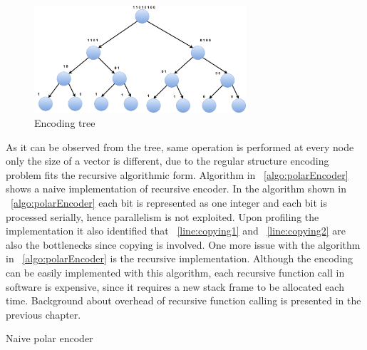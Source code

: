 \begin{figure}[]
	\centering
	\includegraphics[width=0.7\textwidth]{./figures/treeEncoding.pdf}
	\caption{Encoding tree}
	\label{fig:treeEncoding}
\end{figure}

As it can be observed from the tree, same operation is performed at every node only the size of a vector is different, due to the regular structure encoding problem fits the recursive algorithmic form. Algorithm in ~\ref{algo:polarEncoder} shows a naive implementation of recursive encoder. In the algorithm shown in ~\ref{algo:polarEncoder} each bit is represented as one integer and each bit is processed serially, hence parallelism is not exploited. Upon profiling the implementation it also identified that ~\ref{line:copying1} and ~\ref{line:copying2} are also the bottlenecks since copying is involved. One more issue with the algorithm in ~\ref{algo:polarEncoder} is the recursive implementation. Although the encoding can be easily implemented with this algorithm, each recursive function call in software is expensive, since it requires a new stack frame to be allocated each time. Background about overhead of recursive function calling is presented in the previous chapter.

\IncMargin{1.5em}
\begin{algorithm}[]
	\caption{Naive polar encoder}
	\label{algo:polarEncoder}	
\end{algorithm}
\DecMargin{1.5em}

